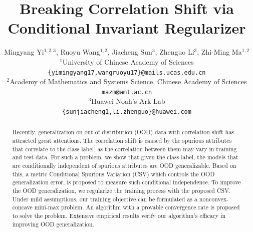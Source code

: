 \documentclass{article} %
\title{Breaking Correlation Shift via Conditional Invariant Regularizer}
\author{Mingyang Yi$^{1,2,3}$, Ruoyu Wang$^{1,2}$, Jiacheng Sun$^{3}$, Zhenguo Li$^{3}$, Zhi-Ming Ma$^{1,2}$\\
	$^{1}$University of Chinese Academy of Sciences\\
	\texttt{\{yimingyang17,wangruoyu17\}@mails.ucas.edu.cn} \\
	$^{2}$Academy of Mathematics and Systems Science, Chinese Academy of Sciences\\
	\texttt{mazm@amt.ac.cn}\\
	$^{3}$Huawei Noah’s Ark Lab\\
	\texttt{\{sunjiacheng1,li.zhenguo\}@huawei.com}
}
\begin{document}
	\date{}
	\maketitle	
	
	\begin{abstract}
		Recently, generalization on out-of-distribution (OOD) data with correlation shift has attracted great attentions. The correlation shift is caused by the spurious attributes that correlate to the class label, as the correlation between them may vary in training and test data. For such a problem, we show that given the class label, the models that are conditionally independent of spurious attributes are OOD generalizable. Based on this, a metric Conditional Spurious Variation (CSV) which controls the OOD generalization error, is proposed to measure such conditional independence. To improve the OOD generalization, we regularize the training process with the proposed CSV. Under mild assumptions, our training objective can be formulated as a nonconvex-concave mini-max problem. An algorithm with a provable convergence rate is proposed to solve the problem. Extensive empirical results verify our algorithm's efficacy in improving OOD generalization.  
	\end{abstract}
\end{document}
